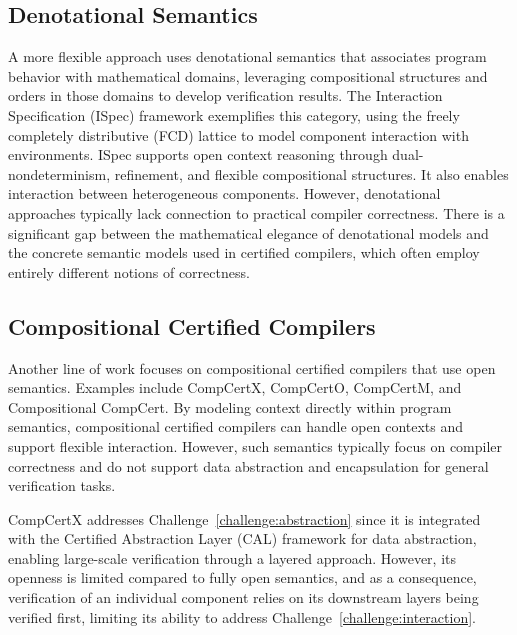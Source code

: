 
\subsection{Denotational Semantics}

A more flexible approach uses denotational semantics
that associates program behavior with mathematical domains,
leveraging compositional structures and orders
in those domains to develop verification results.
The Interaction Specification (ISpec) framework \citep{rbgs-cal}
exemplifies this category,
using the freely completely distributive (FCD) lattice \citep{cspdnd}
to model component interaction with environments.
ISpec supports open context reasoning through dual-nondeterminism,
refinement, and flexible compositional structures.
It also enables interaction between heterogeneous components.
However, denotational approaches typically lack connection
to practical compiler correctness.
There is a significant gap between
the mathematical elegance of denotational models
and the concrete semantic models used in certified compilers,
which often employ entirely different notions of correctness.

\subsection{Compositional Certified Compilers}

Another line of work focuses on compositional certified compilers
that use open semantics.
Examples include CompCertX\citep{popl15}, CompCertO\citep{compcerto}, CompCertM\citep{compcertm},
and Compositional CompCert\citep{compcompcert}.
By modeling context directly within program semantics,
compositional certified compilers can handle open contexts
and support flexible interaction.
However, such semantics typically focus on compiler correctness
and do not support data abstraction and encapsulation
for general verification tasks.

CompCertX addresses Challenge~\ref{challenge:abstraction}
since it is integrated with the Certified Abstraction Layer (CAL) framework\citep{popl15}
for data abstraction,
enabling large-scale verification through a layered approach.
However, its openness is limited compared to fully open semantics,
and as a consequence,
verification of an individual component
relies on its downstream layers being verified first,
limiting its ability to address Challenge~\ref{challenge:interaction}.

